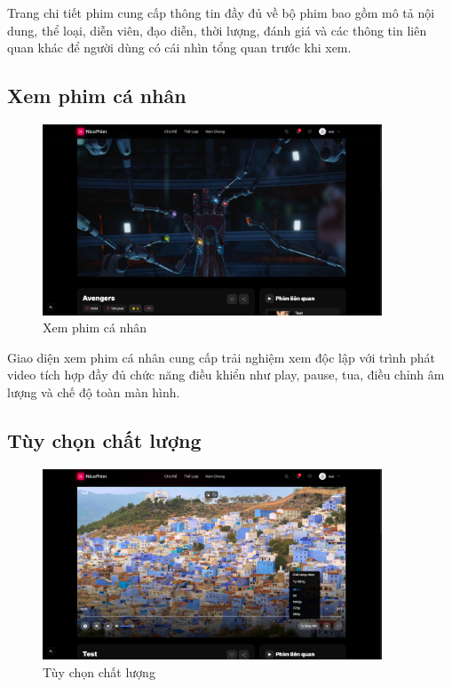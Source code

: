 Trang chi tiết phim cung cấp thông tin đầy đủ về bộ phim bao gồm mô tả nội dung, thể loại, diễn viên, đạo diễn, thời lượng, đánh giá và các thông tin liên quan khác để người dùng có cái nhìn tổng quan trước khi xem.


\subsection{Xem phim cá nhân}
\begin{figure}[H]
	\centering
	\includegraphics[width=0.9\textwidth]{image/demo/xemphim.png}
	\caption{Xem phim cá nhân}
\end{figure}

Giao diện xem phim cá nhân cung cấp trải nghiệm xem độc lập với trình phát video tích hợp đầy đủ chức năng điều khiển như play, pause, tua, điều chỉnh âm lượng và chế độ toàn màn hình.


\subsection{Tùy chọn chất lượng}
\begin{figure}[H]
	\centering
	\includegraphics[width=0.9\textwidth]{image/demo/4K.png}
	\caption{Tùy chọn chất lượng}
\end{figure}

